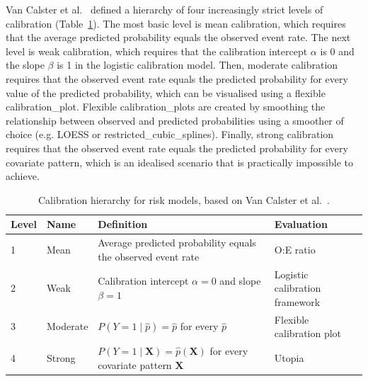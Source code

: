 Van Calster et al.\ \cite{vancalsterCalibrationHierarchyRisk2016} defined a hierarchy of four increasingly strict levels of calibration (Table~\ref{tab:intro:calhierarchy}). The most basic level is mean calibration, which requires that the average predicted probability equals the observed event rate. The next level is weak calibration, which requires that the calibration intercept $\alpha$ is 0 and the slope $\beta$ is 1 in the logistic calibration model. Then, moderate calibration requires that the observed event rate equals the predicted probability for every value of the predicted probability, which can be visualised using a flexible \gls{calibration_plot}. Flexible \glspl{calibration_plot} are created by smoothing the relationship between observed and predicted probabilities using a smoother of choice (e.g. \gls{LOESS} or \gls{restricted_cubic_splines}). Finally, strong calibration requires that the observed event rate equals the predicted probability for every covariate pattern, which is an idealised scenario that is practically impossible to achieve. 

\begin{table}[htbp]
\centering
\begin{threeparttable}
\caption[Calibration hierarchy for risk models]{Calibration hierarchy for risk models, based on Van Calster et al.\ \cite{vancalsterCalibrationHierarchyRisk2016}.}
\label{tab:intro:calhierarchy}
\small
\begin{tabularx}{\textwidth}{llXl}
\toprule
\textbf{Level} & \textbf{Name} & \textbf{Definition} & \textbf{Evaluation} \\
\midrule
1 & Mean & Average predicted probability equals the observed event rate & O:E ratio \\
2 & Weak & Calibration intercept $\alpha = 0$ and slope $\beta = 1$ & Logistic calibration framework \\
3 & Moderate  & $P(Y = 1 \mid \hat{p}) = \hat{p}$ for every $\hat{p}$ & Flexible calibration plot \\
4 & Strong & $P(Y = 1 \mid \mathbf{X}) = \hat{p}(\mathbf{X})$ for every covariate pattern $\mathbf{X}$ & Utopia \\
\bottomrule
\end{tabularx}
\end{threeparttable}
\end{table}



